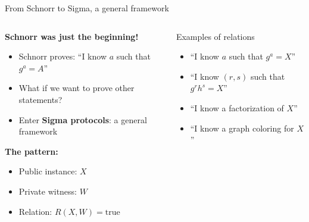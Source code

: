 \documentclass[aspectratio=169, lualatex, handout]{beamer}
\begin{document}
\begin{frame}{From Schnorr to Sigma, a general framework}
	\begin{columns}[c]
		\begin{column}{0.5\textwidth}
			\textbf{Schnorr was just the beginning!}
			\begin{itemize}
				\item Schnorr proves: ``I know $a$ such that $g^a = A$''
				\item What if we want to prove other statements?
				\item Enter \textbf{Sigma protocols}: a general framework
			\end{itemize}
			\vspace{0.5em}
			\textbf{The pattern:}
			\begin{itemize}
				\item Public instance: $X$
				\item Private witness: $W$
				\item Relation: $R(X, W) = \text{true}$
			\end{itemize}
		\end{column}
		\begin{column}{0.5\textwidth}
			\begin{exampleblock}{Examples of relations}
				\begin{itemize}
					\item ``I know $a$ such that $g^a = X$''
					\item ``I know $(r, s)$ such that $g^r h^s = X$''
					\item ``I know a factorization of $X$''
					\item ``I know a graph coloring for $X$''
				\end{itemize}
			\end{exampleblock}
		\end{column}
	\end{columns}
\end{frame}
\end{document}
